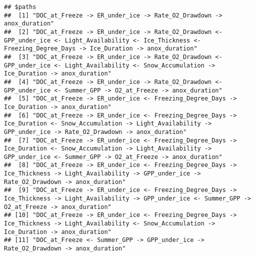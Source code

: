 \documentclass[
]{article}
\begin{document}
\begin{verbatim}
## $paths
##  [1] "DOC_at_Freeze -> ER_under_ice -> Rate_O2_Drawdown -> anox_duration"                                                                                                                                                             
##  [2] "DOC_at_Freeze -> ER_under_ice -> Rate_O2_Drawdown <- GPP_under_ice <- Light_Availability <- Ice_Thickness <- Freezing_Degree_Days -> Ice_Duration -> anox_duration"                                                             
##  [3] "DOC_at_Freeze -> ER_under_ice -> Rate_O2_Drawdown <- GPP_under_ice <- Light_Availability <- Snow_Accumulation -> Ice_Duration -> anox_duration"                                                                                 
##  [4] "DOC_at_Freeze -> ER_under_ice -> Rate_O2_Drawdown <- GPP_under_ice <- Summer_GPP -> O2_at_Freeze -> anox_duration"                                                                                                              
##  [5] "DOC_at_Freeze -> ER_under_ice <- Freezing_Degree_Days -> Ice_Duration -> anox_duration"                                                                                                                                         
##  [6] "DOC_at_Freeze -> ER_under_ice <- Freezing_Degree_Days -> Ice_Duration <- Snow_Accumulation -> Light_Availability -> GPP_under_ice -> Rate_O2_Drawdown -> anox_duration"                                                         
##  [7] "DOC_at_Freeze -> ER_under_ice <- Freezing_Degree_Days -> Ice_Duration <- Snow_Accumulation -> Light_Availability -> GPP_under_ice <- Summer_GPP -> O2_at_Freeze -> anox_duration"                                               
##  [8] "DOC_at_Freeze -> ER_under_ice <- Freezing_Degree_Days -> Ice_Thickness -> Light_Availability -> GPP_under_ice -> Rate_O2_Drawdown -> anox_duration"                                                                             
##  [9] "DOC_at_Freeze -> ER_under_ice <- Freezing_Degree_Days -> Ice_Thickness -> Light_Availability -> GPP_under_ice <- Summer_GPP -> O2_at_Freeze -> anox_duration"                                                                   
## [10] "DOC_at_Freeze -> ER_under_ice <- Freezing_Degree_Days -> Ice_Thickness -> Light_Availability <- Snow_Accumulation -> Ice_Duration -> anox_duration"                                                                             
## [11] "DOC_at_Freeze <- Summer_GPP -> GPP_under_ice -> Rate_O2_Drawdown -> anox_duration"                                                                                                                                              

\end{verbatim}
\end{document}
